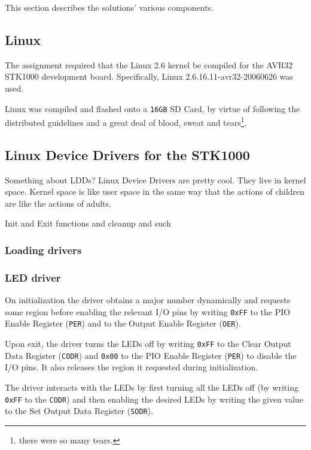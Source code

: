 This section describes the solutions' various components.

\subsection{Linux}
	The assignment required that the Linux 2.6 kernel be compiled for the AVR32 STK1000 development board.
	Specifically, Linux 2.6.16.11-avr32-20060626 was used.

	Linux was compiled and flashed onto a \texttt{16GB} SD Card, by virtue of following the distributed guidelines and a great deal of blood, sweat and tears\footnote{there were so many tears.}.

\subsection{Linux Device Drivers for the STK1000}
	Something about LDDs?
	Linux Device Drivers are pretty cool.
	They live in kernel space.
	Kernel space is like user space in the same way that the actions of children are like the actions of adults.


	Init and Exit functions and cleanup and such

	\subsubsection{Loading drivers}


	\subsubsection{LED driver}
		On initialization the driver obtains a major number dynamically and requests some region before enabling the relevant I/O pins by writing \texttt{0xFF} to the PIO Enable Register (\texttt{PER}) and to the Output Enable Register (\texttt{OER}).
		
		Upon exit, the driver turns the LEDs off by writing \texttt{0xFF} to the Clear Output Data Register (\texttt{CODR}) and \texttt{0x00} to the PIO Enable Register (\texttt{PER}) to disable the I/O pins.
		It also releases the region it requested during initialization.

		The driver interacts with the LEDs by first turning all the LEDs off (by writing \texttt{0xFF} to the \texttt{CODR}) and then enabling the desired LEDs by writing the given value to the Set Output Data Register (\texttt{SODR}).


